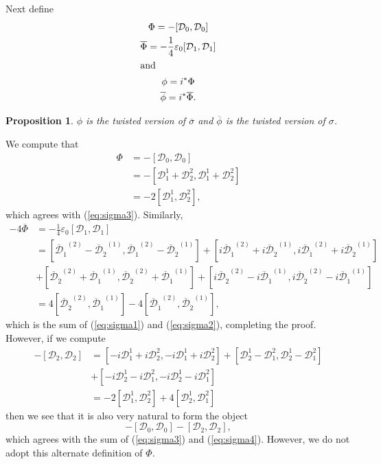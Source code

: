 \documentclass[twoside]{amsart}
\newtheorem{prop}{Proposition}
\renewcommand{\eqref}[1]{(\ref{eq:#1})}
\renewcommand{\epsilon}{\varepsilon}
\newcommand{\enm}[1]{\ensuremath{#1}}
\newcommand{\cdibar}[1]{\enm{\bar{\mathcal{D}}_{\dot{#1}}}}
\renewcommand{\bar}[1]{\overline{#1}}
\newcommand{\onetwoij}[2]{\enm{#1^{(#2)}}}
\newcommand{\one}[1]{\onetwoij{#1}{1}}
\newcommand{\two}[1]{\onetwoij{#1}{2}}
\renewcommand{\epsilon}{\varepsilon}
\newcommand{\doc}{\enm{\mathcal{D}_{1}}}
\newcommand{\dzc}{\enm{\mathcal{D}_{0}}}
\newcommand{\dtc}{\enm{\mathcal{D}_{2}}}
\begin{document}
Next define
\begin{gather*}
    \Phi = -[\dzc,\dzc] \\
    \bar{\Phi} = -\frac{1}{4}\epsilon_0[\doc,\doc] \\
    \intertext{and}
    \phi = i^*\Phi \\
    \bar{\phi} = i^*\bar{\Phi}.
\end{gather*}
\begin{prop}
    \( \phi \) is the twisted version of \( \bar{\sigma} \) and \(
    \bar{\phi} \) is the twisted version of \( \sigma \).
\end{prop}
\proof We compute that
\begin{align*}
    \Phi &= -[\dzc,\dzc]\\
    &=-[\mathcal{D}^{1}_{1}+\mathcal{D}^{2}_{2},
    \mathcal{D}^{1}_{1}+\mathcal{D}^{2}_{2}] \\
    &= -2[\mathcal{D}^{1}_{1},\mathcal{D}^{2}_{2}],
\end{align*}
which agrees with \eqref{sigma3}.  Similarly,
\begin{align*}
    -4\bar{\Phi} &= -\frac{1}{4}\epsilon_{0}[\doc,\doc]\\
    &=[\two{\cdibar{1}}-\one{\cdibar{2}},\two{\cdibar{1}}-
      \one{\cdibar{2}}]
    +[i\two{\cdibar{1}}+i\one{\cdibar{2}},i\two{\cdibar{1}}+i\one{\cdibar{2}
     }]\\
    &+[\two{\cdibar{2}}+\one{\cdibar{1}},\two{\cdibar{2}}+\one{\cdibar{1}}]
    +[i\two{\cdibar{2}}-i\one{\cdibar{1}},i\two{\cdibar{2}}-i\one{\cdibar{1}}]\\
    &=4[\two{\cdibar{2}},\one{\cdibar{1}}]-4[\two{\cdibar{1}},\one{\cdibar{2}}],
\end{align*}
which is the sum of \eqref{sigma1} and \eqref{sigma2},
completing the proof.  However, if we compute
\begin{align*}
    -[\dtc,\dtc] &= [-i\mathcal{D}_{1}^{1}+i\mathcal{D}_{2}^{2},
                     -i\mathcal{D}_{1}^{1}+i\mathcal{D}_{2}^{2}]
                   +[\mathcal{D}_{2}^{1}-\mathcal{D}_{1}^{2},
                     \mathcal{D}_{2}^{1}-\mathcal{D}_{1}^{2}]\\
                  & +[-i\mathcal{D}_{2}^{1}-i\mathcal{D}_{1}^{2},
                     -i\mathcal{D}_{2}^{1}-i\mathcal{D}_{1}^{2}] \\
                 &= -2[\mathcal{D}^{1}_{1}, \mathcal{D}^{2}_{2}] +
                   4[\mathcal{D}_{2}^{1},\mathcal{D}_{1}^{2}]
\end{align*}
then we see that it is also very natural to form the object
\[ -[\dzc,\dzc]-[\dtc,\dtc], \]
which agrees with the sum of \eqref{sigma3} and \eqref{sigma4}.
However, we do not adopt this alternate definition of \( \Phi \).
\end{document}
